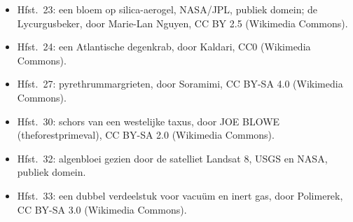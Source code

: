 \begin{itemize}
  \item Hfst.~23: een bloem op silica-aerogel, NASA/JPL, publiek domein; de
        Lycurgusbeker, door Marie-Lan Nguyen, CC BY 2.5 (Wikimedia Commons).
  \item Hfst.~24: een Atlantische degenkrab, door Kaldari, CC0 (Wikimedia
        Commons).
  \item Hfst.~27: pyrethrummargrieten, door Soramimi, CC BY-SA 4.0
        (Wikimedia Commons).
  \item Hfst.~30: schors van een westelijke taxus, door JOE BLOWE
        (theforestprimeval), CC BY-SA 2.0 (Wikimedia Commons).
  \item Hfst.~32: algenbloei gezien door de satelliet Landsat 8, USGS en
        NASA, publiek domein.
  \item Hfst.~33: een dubbel verdeelstuk voor vacuüm en inert gas, door
        Polimerek, CC BY-SA 3.0 (Wikimedia Commons).
\end{itemize}
\clearpage
